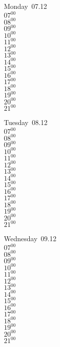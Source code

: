 \documentclass[11pt,a4paper]{book}\usepackage[]{graphicx}\usepackage[]{color}
\begin{document}
\begin{headerbox}
\end{headerbox}
\begin{weekdaybox}
  Monday~07.12\\
  { 
  \vfill
  $07^{00}$\\
$08^{00}$\\
$09^{00}$\\
$10^{00}$\\
$11^{00}$\\
$12^{00}$\\
$13^{00}$\\
$14^{00}$\\
$15^{00}$\\
$16^{00}$\\
$17^{00}$\\
$18^{00}$\\
$19^{00}$\\
$20^{00}$\\
$21^{00}$\\
  }
\end{weekdaybox}
\begin{weekdaybox}
  Tuesday~08.12\\
  { 
  \vfill
  $07^{00}$\\
$08^{00}$\\
$09^{00}$\\
$10^{00}$\\
$11^{00}$\\
$12^{00}$\\
$13^{00}$\\
$14^{00}$\\
$15^{00}$\\
$16^{00}$\\
$17^{00}$\\
$18^{00}$\\
$19^{00}$\\
$20^{00}$\\
$21^{00}$\\
  }
\end{weekdaybox}
\begin{weekdaybox}
  Wednesday~09.12\\
  { 
  \vfill
  $07^{00}$\\
$08^{00}$\\
$09^{00}$\\
$10^{00}$\\
$11^{00}$\\
$12^{00}$\\
$13^{00}$\\
$14^{00}$\\
$15^{00}$\\
$16^{00}$\\
$17^{00}$\\
$18^{00}$\\
$19^{00}$\\
$20^{00}$\\
$21^{00}$\\
  }
\end{weekdaybox}
\end{document}
